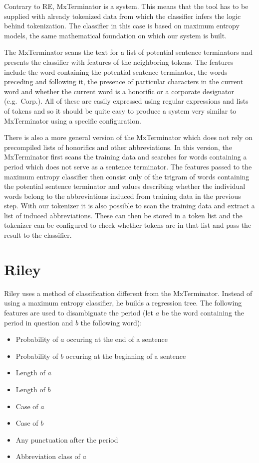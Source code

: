 Contrary to RE, MxTerminator is a  system.
This means that the tool has to be supplied with already tokenized data from
which the classifier infers the logic behind tokenization. The classifier in
this case is based on maximum entropy models, the same mathematical foundation
on which our system is built.

The MxTerminator scans the text for a list of potential sentence terminators
and presents the classifier with features of the neighboring tokens. The
features include the word containing the potential sentence terminator, the
words preceding and following it, the presence of particular characters in the
current word and whether the current word is a honorific or a corporate
designator (e.g.\ Corp.). All of these are easily expressed using regular
expressions and lists of tokens and so it should be quite easy to produce a
system very similar to MxTerminator using a specific configuration.

There is also a more general version of the MxTerminator which does not rely on
precompiled lists of honorifics and other abbreviations. In this version, the
MxTerminator first scans the training data and searches for words containing a
period which does not serve as a sentence terminator. The features passed to
the maximum entropy classifier then consist only of the trigram of words
containing the potential sentence terminator and values describing whether the
individual words belong to the abbreviations induced from training data in the
previous step. With our tokenizer it is also possible to scan the training data
and extract a list of induced abbreviations. These can then be stored in a
token list and the tokenizer can be configured to check whether tokens are in
that list and pass the result to the classifier.

\section{Riley}
\label{sec:survey-riley}

Riley uses a method of classification different from the MxTerminator. Instead
of using a maximum entropy classifier, he builds a regression tree. The
following features are used to disambiguate the period (let $a$ be the word
containing the period in question and $b$ the following word):

\begin{itemize}
  \item Probability of $a$ occuring at the end of a sentence
  \item Probability of $b$ occuring at the beginning of a sentence
  \item Length of $a$
  \item Length of $b$
  \item Case of $a$
  \item Case of $b$
  \item Any punctuation after the period
  \item Abbreviation class of $a$
\end{itemize}

